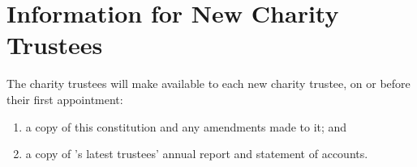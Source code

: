 \section{Information for New Charity Trustees}\label{sec:new_trustees}
The charity trustees will make available to each new charity trustee, on or before their first appointment:
\begin{enumerate}
    \item a copy of this constitution and any amendments made to it; and
    \item a copy of \shortname{}'s latest trustees’ annual report and statement of accounts.
\end{enumerate}
